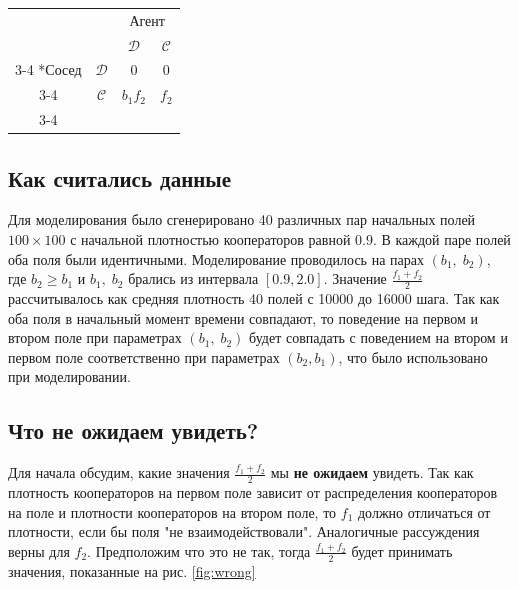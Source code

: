 \documentclass[12pt]{article}
\begin{document}
        \begin{minipage}{\linewidth}
        \centering
         \label{tab:2} 
        \setlength{\extrarowheight}{2pt}
        \begin{tabular}{cc|c|c|}
        & \multicolumn{1}{c}{} & \multicolumn{2}{c}{Агент}\\
        & \multicolumn{1}{c}{} & \multicolumn{1}{c}{$\mathcal{D}$}  & \multicolumn{1}{c}{$\mathcal{C}$} \\\cline{3-4}
        \multirow{2}*{Сосед}  & $\mathcal{D}$ & $0$ & $0$ \\\cline{3-4}
        & $\mathcal{C}$ & $b_1 f_2$ & $f_2$ \\\cline{3-4}
        \end{tabular}
        \end{minipage}
    
    \subsection{Как считались данные}
        Для моделирования было сгенерировано 40 различных пар начальных полей $100\times100$ с начальной плотностью кооператоров равной $0.9$. В каждой паре полей оба поля были идентичными.
        Моделирование проводилось на парах $(b_1,\;b_2)$, где $b_2 \geq b_1$ и $b_1,\;b_2$ брались из интервала $[0.9, 2.0]$. Значение $\frac{f_1+f_2}{2}$ рассчитывалось как средняя плотность 40 полей с 10000 до 16000 шага.
        Так как оба поля в начальный момент времени совпадают, то поведение на первом и втором поле при параметрах $(b_1,\;b_2)$ будет совпадать с поведением на втором и первом поле соответственно при параметрах $(b_2, b_1)$, что было использовано при моделировании.
        
    \subsection{Что не ожидаем увидеть?}
        Для начала обсудим, какие значения $\frac{f_1+f_2}{2}$ мы \textbf{не ожидаем} увидеть. Так как плотность кооператоров на первом поле зависит от распределения кооператоров на поле и плотности кооператоров на втором поле, то $f_1$ должно отличаться от плотности, если бы поля "не взаимодействовали". Аналогичные рассуждения верны для $f_2$. Предположим что это не так, тогда $\frac{f_1+f_2}{2}$ будет принимать значения, показанные на рис.
        \ref{fig:wrong}
        
\end{document}

